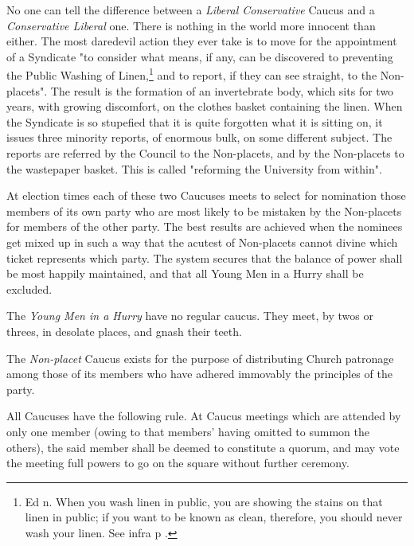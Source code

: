 \documentclass[12pt, oneside, b5paper]{memoir}
\begin{document}
No one can tell the difference between a \textit{Liberal Conservative} Caucus and a \textit{Conservative Liberal} one. There is nothing in the world more innocent than either. The most daredevil action they ever take is to move for the appointment of a Syndicate "to consider what means, if any, can be discovered to preventing the Public Washing of Linen,\footnote{Ed n. When you wash linen in public, you are showing the stains on that linen in public; if you want to be known as clean, therefore, you should never wash your linen. See infra p \pageref{linen}.} and to report, if they can see straight, to the Non-placets". The result is the formation of an invertebrate body, which sits for two years, with growing discomfort, on the clothes basket containing the linen. When the Syndicate is so stupefied that it is quite forgotten what it is sitting on, it issues three minority reports, of enormous bulk, on some different subject. The reports are referred by the Council to the Non-placets, and by the Non-placets to the wastepaper basket. This is called "reforming the University from within".

At election times each of these two Caucuses meets to select for nomination those members of its own party who are most likely to be mistaken by the Non-placets for members of the other party. The best results are achieved when the nominees get mixed up in such a way that the acutest of Non-placets cannot divine which ticket represents which party. The system secures that the balance of power shall be most happily maintained, and that all Young Men in a Hurry shall be excluded.

The \textit{Young Men in a Hurry} have no regular caucus. They meet, by twos or threes, in desolate places, and gnash their teeth.

The \textit{Non-placet} Caucus exists for the purpose of distributing Church patronage among those of its members who have adhered immovably the principles of the party.

All Caucuses have the following rule. At Caucus meetings which are attended by only one member (owing to that members' having omitted to summon the others), the said member shall be deemed to constitute a quorum, and may vote the meeting full powers to go on the square without further ceremony.
\end{document}
